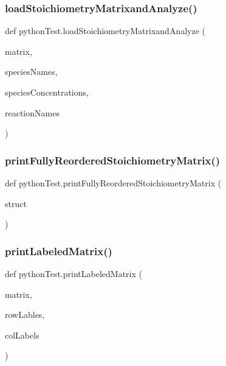 \subsubsection{\texorpdfstring{load\+Stoichiometry\+Matrixand\+Analyze()}{loadStoichiometryMatrixandAnalyze()}}
{\footnotesize\ttfamily def python\+Test.\+load\+Stoichiometry\+Matrixand\+Analyze (\begin{DoxyParamCaption}\item[{}]{matrix,  }\item[{}]{species\+Names,  }\item[{}]{species\+Concentrations,  }\item[{}]{reaction\+Names }\end{DoxyParamCaption})}

\mbox{\label{namespacepython_test_ad1c52a7e80b94b89987c43cf46c972bc}} 
\subsubsection{\texorpdfstring{print\+Fully\+Reordered\+Stoichiometry\+Matrix()}{printFullyReorderedStoichiometryMatrix()}}
{\footnotesize\ttfamily def python\+Test.\+print\+Fully\+Reordered\+Stoichiometry\+Matrix (\begin{DoxyParamCaption}\item[{}]{struct }\end{DoxyParamCaption})}

\mbox{\label{namespacepython_test_a73da44c65a4eed87a4d1c17688e1f556}} 
\subsubsection{\texorpdfstring{print\+Labeled\+Matrix()}{printLabeledMatrix()}}
{\footnotesize\ttfamily def python\+Test.\+print\+Labeled\+Matrix (\begin{DoxyParamCaption}\item[{}]{matrix,  }\item[{}]{row\+Lables,  }\item[{}]{col\+Labels }\end{DoxyParamCaption})}



